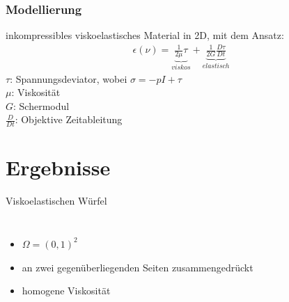 \documentclass{beamer}
\begin{document}
\begin{frame}
	\frametitle{Modellierung}
	inkompressibles viskoelastisches Material in 2D, mit dem Ansatz:
	\begin{align*}
		\epsilon (\nu) = \underbrace{\frac{1}{2\mu}\tau}_{viskos} + \underbrace{\frac{1}{2G}\frac{D\tau}{Dt}}_{elastisch}
	\end{align*}
	$\tau$: Spannungsdeviator, wobei $\sigma = -pI+\tau$ \\
	$\mu$: Viskosität \\
	$G$: Schermodul \\
	$\frac{D}{Dt}$: Objektive Zeitableitung
\end{frame}
\section{Ergebnisse}
\begin{frame}
	Viskoelastischen Würfel 
	\begin{columns}
		\begin{itemize}
			\item $\Omega = (0,1)^2$
			\item an  zwei gegenüberliegenden Seiten zusammengedrückt
			\item homogene Viskosität 
		\end{itemize}
	
		
	\end{columns}
\end{frame}
\end{document}
